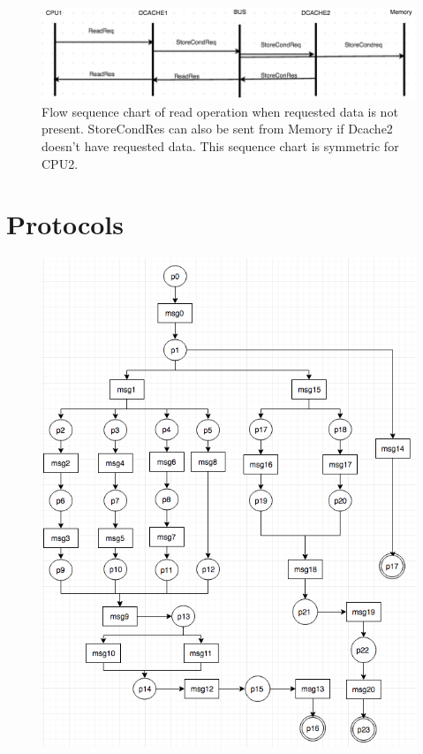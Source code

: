 \documentclass[12pt,frontmatter,copyright,thesis]{usfmanus}
\begin{document}
\begin{appendix}
\begin{figure}[h]
 \centerline{
 \includegraphics[width=3.9In]{figures/read2.png}}
 \caption{\footnotesize Flow sequence chart of read operation when requested data is not present. StoreCondRes can also be sent from Memory if Dcache2 doesn't have requested data. This sequence chart is symmetric for CPU2. }
 \label{read2}
 \end{figure}
\newpage
\section{Protocols}%
\begin{figure}[h]
\centerline{
 \includegraphics[width=3.1In]{figures/Fig5.png}}%
\begin{minipage}{.5\textwidth}

\end{minipage}
\end{figure}
\end{appendix}
\end{document}
